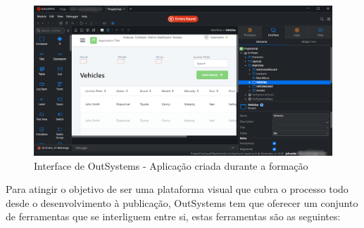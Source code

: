       \begin{figure}[H]
          \centering
          \includegraphics[width=\textwidth]{imgs/InterfaceOutSystems.png}
          \caption{Interface de OutSystems - Aplicação criada durante a formação}\label{fig:interfaceoutsystems}
      \end{figure}

      Para atingir o objetivo de ser uma plataforma visual que cubra o processo todo desde o desenvolvimento à publicação, OutSystems tem que oferecer um conjunto de ferramentas que se interliguem entre si, estas ferramentas são as seguintes:


